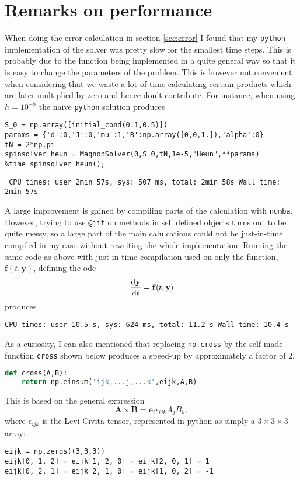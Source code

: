 \section{Remarks on performance}
When doing the error-calculation in section \ref{sec:error} I found that my \texttt{python} implementation of the solver was pretty slow for the smallest time steps. This is probably due to the function being implemented in a quite general way so that it is easy to change the parameters of the problem. This is however not convenient when considering that we waste a lot of time calculating certain products which are later multiplied by zero and hence don't contribute. For instance, when using $h = 10^{-5}$ the naive \texttt{python} solution produces
\begin{lstlisting}
S_0 = np.array([initial_cond(0.1,0.5)])
params = {'d':0,'J':0,'mu':1,'B':np.array([0,0,1.]),'alpha':0}
tN = 2*np.pi
spinsolver_heun = MagnonSolver(0,S_0,tN,1e-5,"Heun",**params)
%time spinsolver_heun();
\end{lstlisting}
\texttt{\small
	CPU times: user 2min 57s, sys: 507 ms, total: 2min 58s
	Wall time: 2min 57s
}

A large improvement is gained by compiling parts of the calculation with \texttt{numba}. However, trying to use \texttt{@jit} on methods in self defined objects turns out to be quite messy, so a large part of the main calulcations could not be just-in-time compiled in my case without rewriting the whole implementation. Running the same code as above with just-in-time compilation used on only the function, $\mathbf{f}(t,\mathbf{y})$, defining the ode 
$$
	\frac{\text{d} \mathbf{y}}{\text{d} t} = \mathbf{f}(t,\mathbf{y})
$$	 
produces

\texttt{\small CPU times: user 10.5 s, sys: 624 ms, total: 11.2 s
Wall time: 10.4 s
}

As a curiosity, I can also mentioned that replacing \texttt{np.cross} by the self-made function \texttt{cross} shown below produces a speed-up by approximately a factor of 2.
\begin{lstlisting}[language = Python]
def cross(A,B):
	return np.einsum('ijk,...j,...k',eijk,A,B)
\end{lstlisting}

This is based on the general expression
$$
	\mathbf{A} \times \mathbf{B} = \mathbf{e}_i \epsilon_{ijk} A_j B_k,
$$
where $\epsilon_{ijk}$ is the Levi-Civita tensor, represented in python as simply a $3\times3\times3$ array:
\begin{lstlisting}
eijk = np.zeros((3,3,3))
eijk[0, 1, 2] = eijk[1, 2, 0] = eijk[2, 0, 1] = 1
eijk[0, 2, 1] = eijk[2, 1, 0] = eijk[1, 0, 2] = -1
\end{lstlisting}

